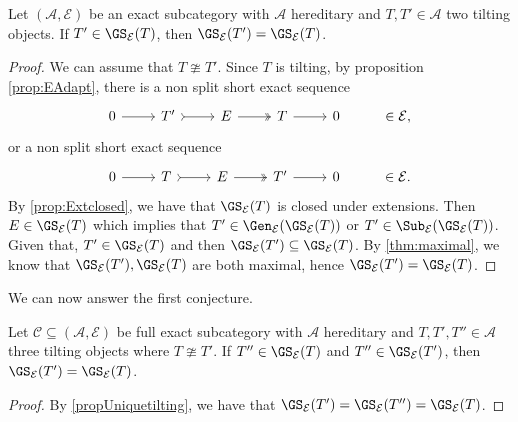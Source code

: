 \begin{lemma}\label{propUniquetilting}
Let $(\mathscr{A},\mathcal{E})$ be an exact subcategory with $\mathscr{A}$ hereditary and $T,T' \in \mathscr{A}$ two tilting objects. If $T' \in \GS_\mathcal{E}(T)$, then $\GS_\mathcal{E}(T') = \GS_\mathcal{E}(T)$. 
\end{lemma}

\begin{proof}
We can assume that $T \ncong T'$. Since $T$ is tilting, by proposition \ref{prop:EAdapt}, there is a non split short exact sequence \[\begin{tikzcd}
	0 & T' & E  & T &  0 & \in \mathcal{E},
	\arrow[from=1-1, to=1-2]
	\arrow[tail, from=1-2, to=1-3]
	\arrow[two heads,from=1-3, to=1-4]
	\arrow[from=1-4, to=1-5]
\end{tikzcd} \] or a non split short exact sequence \[\begin{tikzcd}
	0 & T & E  & T' &  0 & \in \mathcal{E}.
	\arrow[from=1-1, to=1-2]
	\arrow[tail, from=1-2, to=1-3]
	\arrow[two heads,from=1-3, to=1-4]
	\arrow[from=1-4, to=1-5]
\end{tikzcd} \]  By \cref{prop:Extclosed}, we have that $\GS_\mathcal{E}(T)$ is closed under extensions. Then $E \in \GS_\mathcal{E}(T)$ which implies that $T' \in \Gen_\mathcal{E}(\GS_\mathcal{E}(T))$ or $T' \in \Sub_\mathcal{E}(\GS_\mathcal{E}(T))$. Given that, $T' \in \GS_\mathcal{E}(T)$ and then $\GS_\mathcal{E}(T') \subseteq \GS_\mathcal{E}(T)$.  By \cref{thm:maximal}, we know that $\GS_\mathcal{E}(T'),\GS_\mathcal{E}(T)$ are both maximal, hence $\GS_\mathcal{E}(T') = \GS_\mathcal{E}(T)$.
\end{proof}
\ibenj{}

We can now answer the first conjecture. 

\begin{theorem}
\label{th:tiltunique}
Let $\mathscr{C} \subseteq (\mathscr{A},\mathcal{E})$ be full exact subcategory with $\mathscr{A}$ hereditary and $T,T',T'' \in \mathscr{A}$ three tilting objects where $T \ncong T'$. If $T'' \in \GS_\mathcal{E}(T)$ and $T'' \in \GS_\mathcal{E}(T')$, then $\GS_\mathcal{E}(T') = \GS_\mathcal{E}(T)$. 
\end{theorem}

\begin{proof}
By \cref{propUniquetilting}, we have that $\GS_\mathcal{E}(T') = \GS_\mathcal{E}(T'') = \GS_\mathcal{E}(T)$. 
\end{proof}

